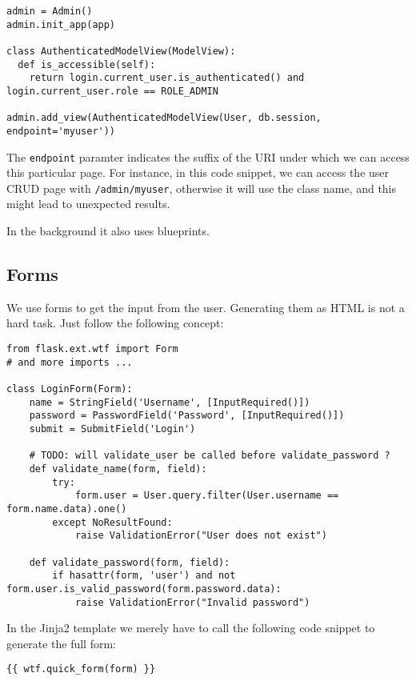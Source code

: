 \documentclass[../main/main.tex]{subfiles}
\begin{document}
\begin{lstlisting}
admin = Admin()
admin.init_app(app)

class AuthenticatedModelView(ModelView):
  def is_accessible(self):
    return login.current_user.is_authenticated() and login.current_user.role == ROLE_ADMIN

admin.add_view(AuthenticatedModelView(User, db.session, endpoint='myuser'))

\end{lstlisting}

The \lstinline|endpoint| paramter indicates the suffix of the URI under which we
can access this particular page. For instance, in this code snippet, we can
access the user CRUD page with \lstinline|/admin/myuser|, otherwise it will use
the class name, and this might lead to unexpected results. 

In the background it also uses blueprints. 

\subsection{Forms}

We use forms to get the input from the user. Generating them as HTML is
not a hard task. Just follow the following concept: 

\begin{lstlisting}
from flask.ext.wtf import Form
# and more imports ... 

class LoginForm(Form):
    name = StringField('Username', [InputRequired()])
    password = PasswordField('Password', [InputRequired()])
    submit = SubmitField('Login')

    # TODO: will validate_user be called before validate_password ?
    def validate_name(form, field):
        try:
            form.user = User.query.filter(User.username == form.name.data).one()
        except NoResultFound:
            raise ValidationError("User does not exist")

    def validate_password(form, field):
        if hasattr(form, 'user') and not form.user.is_valid_password(form.password.data):
            raise ValidationError("Invalid password")
\end{lstlisting}

In the Jinja2 template we merely have to call the following code snippet
to generate the full form: 

\begin{lstlisting}
{{ wtf.quick_form(form) }}
\end{lstlisting}
\end{document}
